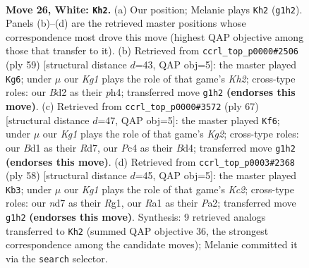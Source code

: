 \documentclass[11pt]{article}
\begin{document}
\clearpage

\begin{figure}[p]\centering
\begin{subfigure}{0.46\textwidth}\centering
\resizebox{\linewidth}{!}{%
\newchessgame
\chessboard[
  setfen={r1b4k/3n4/1p4p1/2p2p2/2P2P2/p1P3P1/P2B4/R2B2K1 w - - 1 26},
  showmover=false,
  pgfstyle=straightmove, color=movearrow, markmove={g1-h2}
]}
\caption{}
\end{subfigure}\hfill
\begin{subfigure}{0.46\textwidth}\centering
\resizebox{\linewidth}{!}{%
\newchessgame
\chessboard[
  setfen={r3b3/5ppk/4p3/6Pp/p6P/P3PP2/8/2R1B1K1 b - - 0 30},
  showmover=false,
  pgfstyle=straightmove, color=movearrow, markmove={h7-g6}
]}
\caption{}
\end{subfigure}
\\[4pt]
\begin{subfigure}{0.46\textwidth}\centering
\resizebox{\linewidth}{!}{%
\newchessgame
\chessboard[
  setfen={8/3r1pk1/1p2p3/6p1/1PPbP2p/3N1P1P/R7/4K3 b - - 4 34},
  showmover=false,
  pgfstyle=straightmove, color=movearrow, markmove={g7-f6}
]}
\caption{}
\end{subfigure}\hfill
\begin{subfigure}{0.46\textwidth}\centering
\resizebox{\linewidth}{!}{%
\newchessgame
\chessboard[
  setfen={7r/2k3p1/p1n1ppP1/1pB5/1P3P1p/2P4P/P1K5/6R1 w - - 7 30},
  showmover=false,
  pgfstyle=straightmove, color=movearrow, markmove={c2-b3}
]}
\caption{}
\end{subfigure}
\caption{\textbf{Move 26, White: \texttt{Kh2}.} (a) Our position; Melanie plays \texttt{Kh2} (\texttt{g1h2}). Panels (b)--(d) are the retrieved master positions whose correspondence most drove this move (highest QAP objective among those that transfer to it). (b) Retrieved from \texttt{ccrl\_top\_p0000\#2506} (ply 59) [structural distance $d$=43, QAP obj=5]: the master played \texttt{Kg6}; under $\mu$ our \emph{Kg1} plays the role of that game's \emph{Kh2}; cross-type roles: our \emph{B}d2 as their \emph{p}h4; transferred move \texttt{g1h2} \textbf{(endorses this move)}. (c) Retrieved from \texttt{ccrl\_top\_p0000\#3572} (ply 67) [structural distance $d$=47, QAP obj=5]: the master played \texttt{Kf6}; under $\mu$ our \emph{Kg1} plays the role of that game's \emph{Kg2}; cross-type roles: our \emph{B}d1 as their \emph{R}d7, our \emph{P}c4 as their \emph{B}d4; transferred move \texttt{g1h2} \textbf{(endorses this move)}. (d) Retrieved from \texttt{ccrl\_top\_p0003\#2368} (ply 58) [structural distance $d$=45, QAP obj=5]: the master played \texttt{Kb3}; under $\mu$ our \emph{Kg1} plays the role of that game's \emph{Kc2}; cross-type roles: our \emph{n}d7 as their \emph{R}g1, our \emph{R}a1 as their \emph{P}a2; transferred move \texttt{g1h2} \textbf{(endorses this move)}. Synthesis: 9 retrieved analogs transferred to \texttt{Kh2} (summed QAP objective 36, the strongest correspondence among the candidate moves); Melanie committed it via the \texttt{search} selector.}
\label{fig:thought-m50}
\end{figure}
\end{document}
